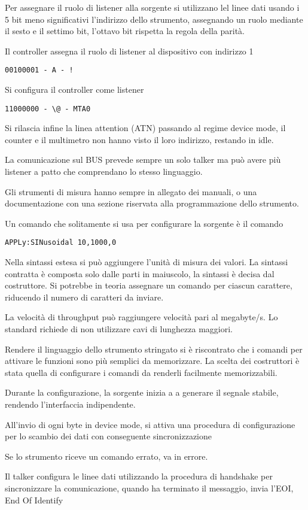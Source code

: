 Per assegnare il ruolo di listener alla sorgente si utilizzano lel linee dati
usando i 5 bit meno significativi l'indirizzo dello strumento, assegnando un
ruolo mediante il sesto e il settimo bit, l'ottavo bit rispetta la regola della
parità.

Il controller assegna il ruolo di listener al dispositivo con indirizzo 1

\verb|00100001 - A - !|

Si configura il controller come listener

\verb|11000000 - \@ - MTA0|

Si rilascia infine la linea attention (ATN) passando al regime device mode, il
counter e il multimetro non hanno visto il loro indirizzo, restando in idle.

La comunicazione sul BUS prevede sempre un solo talker ma può avere più
listener a patto che comprendano lo stesso linguaggio.

Gli strumenti di misura hanno sempre in allegato dei manuali, o una
documentazione con una sezione riservata alla programmazione dello strumento.

Un comando che solitamente si usa per configurare la sorgente è il comando

\verb|APPLy:SINusoidal 10,1000,0|

Nella sintassi estesa si può aggiungere l'unità di misura dei valori.
La sintassi contratta è composta solo dalle parti in maiuscolo, la sintassi è
decisa dal costruttore.
Si potrebbe in teoria assegnare un comando per ciascun carattere, riducendo il
numero di caratteri da inviare.

La velocità di throughput può raggiungere velocità pari al megabyte/s.
Lo standard richiede di non utilizzare cavi di lunghezza maggiori.

Rendere il linguaggio dello strumento stringato si è riscontrato che i comandi
per attivare le funzioni sono più semplici da memorizzare.
La scelta dei costruttori è stata quella di configurare i comandi da renderli
facilmente memorizzabili.

Durante la configurazione, la sorgente inizia a a generare il segnale stabile,
rendendo l'interfaccia indipendente.

All'invio di ogni byte in device mode, si attiva una procedura di
configurazione per lo scambio dei dati con conseguente sincronizzazione

Se lo strumento riceve un comando errato, va in errore.

Il talker configura le linee dati utilizzando la procedura di handshake per
sincronizzare la comunicazione, quando ha terminato il messaggio, invia l'EOI,
End Of Identify


